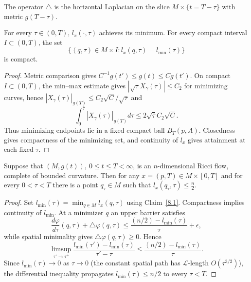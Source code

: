\begin{remark}
\label{rem:horizontal-laplacian-convention}
The operator $\triangle$ is the horizontal Laplacian on the slice
$M\times\{t=T-\tau\}$ with metric $g(T-\tau)$.
\end{remark}

\begin{claim}
\label{claim:l-min-achieved-compact}
\label{8.1}
For every $\tau\in(0,T)$, $l_x(\cdot,\tau)$ achieves its minimum. For
every compact interval $I\subset(0,T)$, the set
\[
\{(q,\tau)\in M\times I:l_x(q,\tau)=l_\mathrm{min}(\tau)\}
\]
is compact.
\end{claim}

\begin{proof}\sketch
{}
Metric comparison gives $C^{-1}g(t')\le g(t)\le Cg(t')$. On compact
$I\subset(0,T)$, the min--max estimate gives
$|\sqrt{\tau}X_\gamma(\tau)|\le C_2$ for minimizing curves, hence
$|X_\gamma(\tau)|_{g(T)}\le C_2\sqrt C/\sqrt\tau$ and
\[
\int_0^{\bar\tau}|X_\gamma(\tau)|_{g(T)}d\tau
\le2\sqrt{\bar\tau}C_2\sqrt C.
\]
Thus minimizing endpoints lie in a fixed compact ball $B_T(p,A)$.
Closedness gives compactness of the minimizing set, and continuity of
$l_x$ gives attainment at each fixed $\tau$.
\end{proof}

\begin{theorem}
\label{thm:min-l-bound-n-half}
\label{n/2} Suppose that $(M,g(t)),\ 0\le t\le T<\infty$,
is an $n$-dimensional Ricci flow, complete of bounded curvature.
Then for any $x=(p,T)\in M\times [0,T]$ and for every $0<\tau<T$
there is a point $q_\tau\in M$ such that $l_{x}(q_\tau,\tau)\le
\frac{n}{2}$.
\end{theorem}

\begin{proof}
  \sketch

Set $l_\mathrm{min}(\tau)=\min_{q\in M}l_x(q,\tau)$ using
Claim~\ref{8.1}. Compactness implies continuity of $l_\mathrm{min}$. At a
minimizer $q$ an upper barrier satisfies
\[
\frac{d\varphi}{d\tau}(q,\tau)+\triangle\varphi(q,\tau)
\le\frac{(n/2)-l_\mathrm{min}(\tau)}{\tau}+\epsilon,
\]
while spatial minimality gives $\triangle\varphi(q,\tau)\ge0$. Hence
\[
\limsup_{\tau'\to\tau^+}\frac{l_\mathrm{min}(\tau')-l_\mathrm{min}(\tau)}{\tau'-\tau}
\le\frac{(n/2)-l_\mathrm{min}(\tau)}{\tau}.
\]
Since $l_\mathrm{min}(\tau)\to0$ as $\tau\to0$ (the constant spatial path
has ${\mathcal L}$-length $O(\tau^{3/2})$), the differential inequality
propagates $l_\mathrm{min}(\tau)\le n/2$ to every $\tau<T$.
\end{proof}


